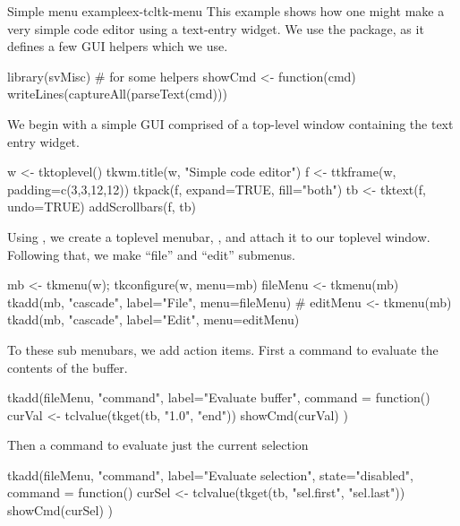 \begin{example}{Simple menu example}{ex-tcltk-menu}
This example shows how one might make a very simple code editor using
a text-entry widget. We use the  package, as it defines a
few GUI helpers which we use.
\begin{Schunk}
\begin{Sinput}
 library(svMisc)                         # for some helpers
 showCmd <- function(cmd) {
   writeLines(captureAll(parseText(cmd)))
 }
\end{Sinput}
\end{Schunk}

We begin with a simple GUI comprised of a top-level window containing
the text entry widget.
\begin{Schunk}
\begin{Sinput}
 w <- tktoplevel()
 tkwm.title(w, "Simple code editor")
 f <- ttkframe(w, padding=c(3,3,12,12)) 
 tkpack(f, expand=TRUE, fill="both")
 tb <- tktext(f, undo=TRUE)
 addScrollbars(f, tb)
\end{Sinput}
\end{Schunk}
%

Using , we create a toplevel menubar, , and
attach it to our toplevel window. Following that, we make ``file'' and ``edit'' submenus.
\begin{Schunk}
\begin{Sinput}
 mb <- tkmenu(w); tkconfigure(w, menu=mb)
 fileMenu <- tkmenu(mb)
 tkadd(mb, "cascade", label="File", menu=fileMenu)
 #
 editMenu <- tkmenu(mb)
 tkadd(mb, "cascade", label="Edit", menu=editMenu)
\end{Sinput}
\end{Schunk}
%

To these sub menubars, we add action items. First a command to
evaluate the contents of the buffer.
\begin{Schunk}
\begin{Sinput}
 tkadd(fileMenu, "command", label="Evaluate buffer",
       command = function() {
         curVal <- tclvalue(tkget(tb, "1.0", "end"))
         showCmd(curVal)
       })
\end{Sinput}
\end{Schunk}

Then a command to evaluate just the current selection
\begin{Schunk}
\begin{Sinput}
 tkadd(fileMenu, "command", label="Evaluate selection",
       state="disabled",
       command = function() {
         curSel <- tclvalue(tkget(tb, "sel.first", "sel.last"))
         showCmd(curSel)
       })
\end{Sinput}
\end{Schunk}


\end{example}
